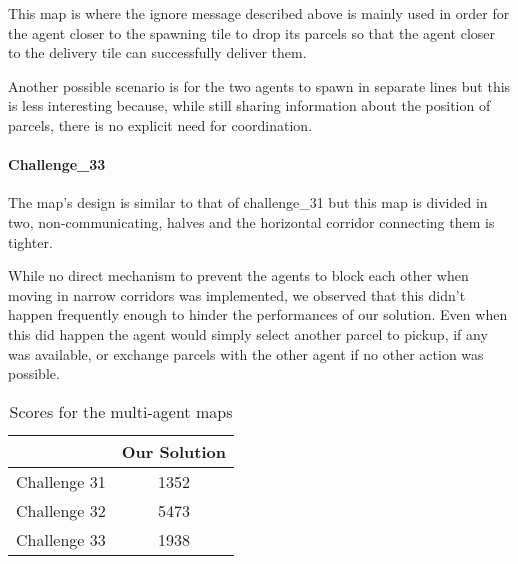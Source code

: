 This map is where the ignore message described above is mainly used in order for the agent closer to the spawning tile to drop its parcels so that the agent closer to the delivery tile can successfully deliver them.

Another possible scenario is for the two agents to spawn in separate lines but this is less interesting because, while still sharing information about the position of parcels, there is no explicit need for coordination.
\paragraph{Challenge\_33} The map's design is similar to that of challenge\_31 but this map is divided in two, non-communicating, halves and the horizontal corridor connecting them is tighter.

While no direct mechanism to prevent the agents to block each other when moving in narrow corridors was implemented, we observed that this didn't happen frequently enough to hinder the performances of our solution. Even when this did happen the agent would simply select another parcel to pickup, if any was available, or exchange parcels with the other agent if no other action was possible.

\begin{table}
    \centering
    \begin{tabular}{c || c} \hline
                     & Our Solution \\ \hline
        Challenge 31 & 1352         \\
        Challenge 32 & 5473         \\
        Challenge 33 & 1938         \\  \hline
    \end{tabular}
    \caption{Scores for the multi-agent maps}
    \label{tab:multi_agent}
\end{table}
